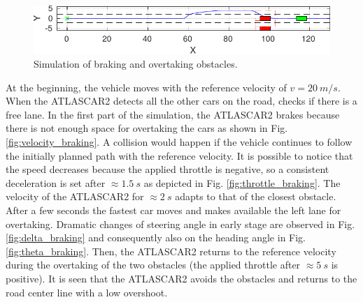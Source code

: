 \documentclass[conference,11pt]{IEEEtran}
\begin{document}
\begin{figure}[!h]
\begin{minipage}[t]{\columnwidth}
	\end{minipage}
	\begin{minipage}[t]{\columnwidth}
		\includegraphics[width=\columnwidth]{./figure/three_obstacles_no_overtaking/braking_6.pdf}
	\end{minipage}
	\caption{Simulation of braking and overtaking obstacles.}
	\label{fig:braking}
\end{figure}

At the beginning, the vehicle moves with the reference velocity of $v=\SI{20}{m/s}$. When the ATLASCAR2 detects all the other cars on the road, checks if there is a free lane. In the first part of the simulation, the ATLASCAR2 brakes because there is not enough space for overtaking the cars as shown in Fig. \ref{fig:velocity_braking}. A collision would happen if the vehicle continues to follow the initially planned path with the reference velocity. It is possible to notice that the speed decreases because the applied throttle is negative, so a consistent deceleration is set after $\approx\SI{1.5}{s}$ as depicted in Fig. \ref{fig:throttle_braking}. The velocity of the ATLASCAR2 for $\approx\SI{2}{s}$ adapts to that of the closest obstacle. After a few seconds the fastest car moves and makes available the left lane for overtaking. Dramatic changes of steering angle in early stage are observed in Fig. \ref{fig:delta_braking} and consequently also on the heading angle in Fig. \ref{fig:theta_braking}. Then, the ATLASCAR2 returns to the reference velocity during the overtaking of the two obstacles (the applied throttle after $\approx\SI{5}{s}$ is positive). It is seen that the ATLASCAR2 avoids the obstacles and returns to the road center line with a low overshoot.
\end{document}
